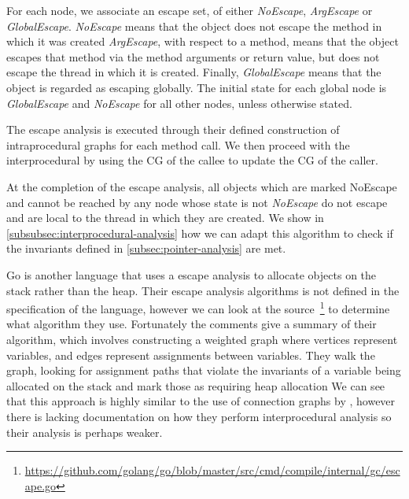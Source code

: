\documentclass{proposal}
\begin{document}
    For each node, we associate an escape set, of either \emph{NoEscape}, \emph{ArgEscape} or \emph{GlobalEscape}.
    \emph{NoEscape} means that the object does not escape the method in which it was created
    \emph{ArgEscape}, with respect to a method, means that the object escapes that method via the method arguments or return value,
    but does not escape the thread in which it is created.
    Finally, \emph{GlobalEscape} means that the object is regarded as escaping globally.
    The initial state for each global node is \emph{GlobalEscape} and \emph{NoEscape} for all other nodes, unless otherwise stated.

    The escape analysis is executed through their defined construction of intraprocedural graphs for each method call.
    We then proceed with the interprocedural by using the CG of the callee to update the CG of the caller.

    At the completion of the escape analysis, all objects which are marked NoEscape and cannot be reached by any node whose state is not \emph{NoEscape} do not escape and are local to the thread in which they are created.
    We show in \autoref{subsubsec:interprocedural-analysis} how we can adapt this algorithm to check if the invariants defined in \autoref{subsec:pointer-analysis} are met.

    Go is another language that uses a escape analysis to allocate objects on the stack rather than the heap.
    Their escape analysis algorithms is not defined in the specification of the language, however we can look at the source~\footnote{\url{https://github.com/golang/go/blob/master/src/cmd/compile/internal/gc/escape.go}} to determine what algorithm they use.
    Fortunately the comments give a summary of their algorithm, which involves constructing a weighted graph where vertices represent variables, and edges represent assignments between variables.
    They walk the graph, looking for assignment paths that violate the invariants of a variable being allocated on the stack and mark those as requiring heap allocation
    We can see that this approach is highly similar to the use of connection graphs by \citet{Choi1999}, however there is lacking documentation on how they perform interprocedural analysis so their analysis is perhaps weaker.
\end{document}
